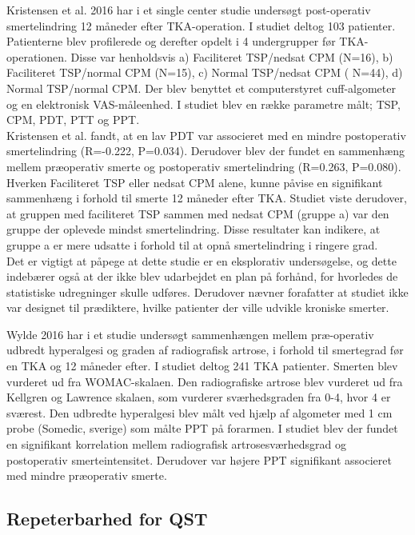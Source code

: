 Kristensen et al. 2016 har i et single center  studie undersøgt post-operativ smertelindring 12 måneder efter TKA-operation. I studiet deltog 103 patienter. Patienterne blev profilerede og derefter opdelt i 4 undergrupper før TKA-operationen. Disse var henholdsvis a)  Faciliteret TSP/nedsat CPM (N=16), b) Faciliteret TSP/normal CPM (N=15), c)  Normal TSP/nedsat CPM ( N=44), d) Normal TSP/normal CPM. Der blev benyttet et computerstyret cuff-algometer og en elektronisk VAS-måleenhed. I studiet blev en række parametre målt; TSP, CPM, PDT, PTT og PPT. \\
Kristensen et al. fandt, at en lav PDT var associeret med en mindre postoperativ smertelindring (R=-0.222, P=0.034). Derudover blev der fundet en sammenhæng mellem præoperativ smerte og postoperativ smertelindring (R=0.263, P=0.080).
Hverken Faciliteret TSP eller nedsat CPM alene, kunne påvise en signifikant sammenhæng i forhold til smerte 12 måneder efter TKA. Studiet viste derudover, at gruppen med faciliteret TSP sammen med nedsat CPM (gruppe a) var den gruppe der oplevede mindst smertelindring.
Disse resultater kan indikere, at gruppe a er mere udsatte i forhold til at opnå smertelindring i ringere grad.\\
Det er vigtigt at påpege at dette studie er en eksplorativ undersøgelse, og dette indebærer også at der ikke blev udarbejdet en plan på forhånd, for hvorledes de statistiske udregninger skulle udføres.
Derudover nævner forafatter at studiet ikke  var designet til prædiktere, hvilke patienter der ville udvikle kroniske smerter.


Wylde 2016 har i et studie undersøgt sammenhængen mellem præ-operativ udbredt hyperalgesi og graden af radiografisk artrose, i forhold til smertegrad før en TKA og 12 måneder efter. I studiet deltog 241 TKA patienter. Smerten blev vurderet ud fra WOMAC-skalaen. Den radiografiske artrose blev vurderet ud fra Kellgren og Lawrence skalaen, som vurderer sværhedsgraden fra 0-4, hvor 4 er sværest. Den udbredte hyperalgesi blev målt ved hjælp af algometer med 1 cm probe (Somedic, sverige) som målte PPT på forarmen.
I studiet blev der fundet en signifikant korrelation mellem radiografisk artrosesværhedsgrad og postoperativ smerteintensitet. Derudover var højere PPT signifikant associeret med mindre præoperativ smerte.	


\subsection{Repeterbarhed for QST}
